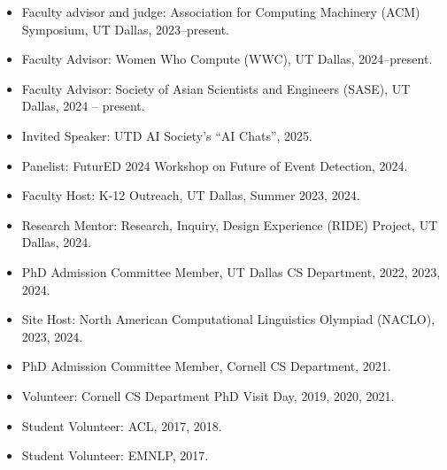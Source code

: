 \begin{itemize}[label={},leftmargin=15pt]
\item Faculty advisor and judge: Association for Computing Machinery (ACM) Symposium, UT Dallas, 2023–present.
\item Faculty Advisor: Women Who Compute (WWC), UT Dallas, 2024--present.
\item Faculty Advisor: Society of Asian Scientists and Engineers (SASE), UT Dallas, 2024 -- present.
\item Invited Speaker: UTD AI Society's ``AI Chats'', 2025.
\item Panelist: FuturED 2024 Workshop on Future of Event Detection, 2024. 
\item Faculty Host: K-12 Outreach, UT Dallas, Summer 2023, 2024.
\item Research Mentor: Research, Inquiry, Design Experience (RIDE) Project, UT Dallas, 2024.
\item PhD Admission Committee Member, UT Dallas CS Department, 2022, 2023, 2024.
\item Site Host: North American Computational Linguistics Olympiad (NACLO), 2023, 2024.
\item PhD Admission Committee Member, Cornell CS Department, 2021.
\item Volunteer: Cornell CS Department PhD Visit Day, 2019, 2020, 2021.
\item Student Volunteer: ACL, 2017, 2018.
\item Student Volunteer: EMNLP, 2017. \\
\end{itemize}

